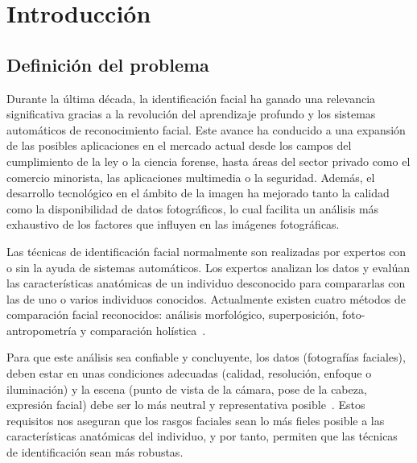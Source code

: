 \chapter{Introducción}
\thispagestyle{empty}

\section{Definición del problema}


Durante la última década, la identificación facial ha ganado una relevancia significativa gracias a la revolución del aprendizaje profundo y los sistemas automáticos de reconocimiento facial. Este avance ha conducido a una expansión de las posibles aplicaciones en el mercado actual desde los campos del cumplimiento de la ley o la ciencia forense, hasta áreas del sector privado como el comercio minorista, las aplicaciones multimedia o la seguridad. Además, el desarrollo tecnológico en el ámbito de la imagen ha mejorado tanto la calidad como la disponibilidad de datos fotográficos, lo cual facilita un análisis más exhaustivo de los factores que influyen en las imágenes fotográficas.

Las técnicas de identificación facial normalmente son realizadas por expertos con o sin la ayuda de sistemas automáticos. Los expertos analizan los datos y evalúan las características anatómicas de un individuo desconocido para compararlas con las de uno o varios individuos conocidos. Actualmente existen cuatro métodos de comparación facial reconocidos: análisis morfológico, superposición, foto-antropometría y comparación holística~\cite{3}.

Para que este análisis sea confiable y concluyente, los datos (fotografías faciales), deben estar en unas condiciones adecuadas (calidad, resolución, enfoque o iluminación) y la escena (punto de vista de la cámara, pose de la cabeza, expresión facial) debe ser lo más neutral y representativa posible~\cite{1,2}. Estos requisitos nos aseguran que los rasgos faciales sean lo más fieles posible a las características anatómicas del individuo, y por tanto, permiten que las técnicas de identificación sean más robustas.

